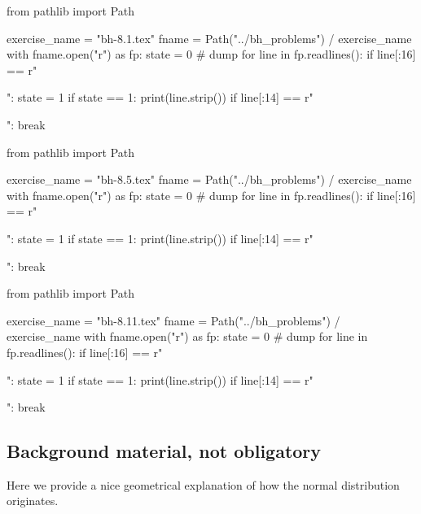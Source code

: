 \begin{pycode}
from pathlib import Path

exercise_name = "bh-8.1.tex"
fname = Path("../bh_problems") / exercise_name
with fname.open("r") as fp:
    state = 0  # dump
    for line in fp.readlines():
        if line[:16] == r"\begin{exercise}":
            state = 1
        if state == 1:
            print(line.strip())
        if line[:14] == r"\end{exercise}":
            break
\end{pycode}



\begin{pycode}
from pathlib import Path

exercise_name = "bh-8.5.tex"
fname = Path("../bh_problems") / exercise_name
with fname.open("r") as fp:
    state = 0  # dump
    for line in fp.readlines():
        if line[:16] == r"\begin{exercise}":
            state = 1
        if state == 1:
            print(line.strip())
        if line[:14] == r"\end{exercise}":
            break
\end{pycode}




\begin{pycode}
from pathlib import Path

exercise_name = "bh-8.11.tex"
fname = Path("../bh_problems") / exercise_name
with fname.open("r") as fp:
    state = 0  # dump
    for line in fp.readlines():
        if line[:16] == r"\begin{exercise}":
            state = 1
        if state == 1:
            print(line.strip())
        if line[:14] == r"\end{exercise}":
            break
\end{pycode}

\subsection{Background material, not obligatory}
\label{sec:backgr-mater-not}

Here we provide  a nice geometrical explanation of how the normal distribution originates.

